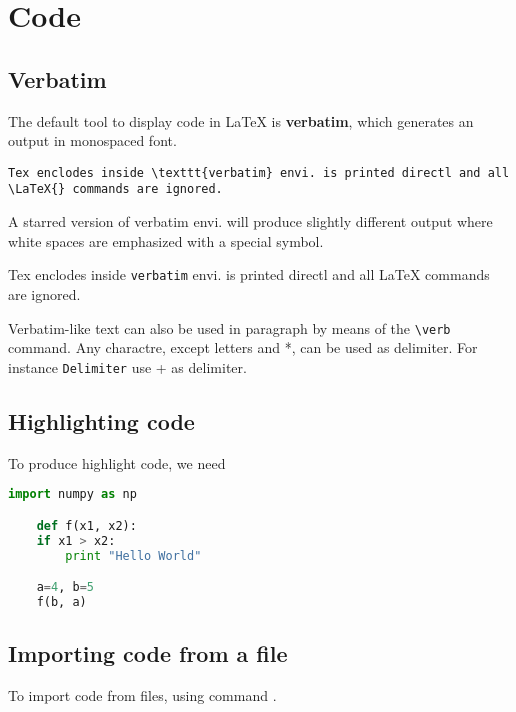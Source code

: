 \section{Code}

\subsection{Verbatim}
The default tool to display code in \LaTeX{} is \textbf{verbatim}, which
generates an output in monospaced font. 
\begin{verbatim}
Tex enclodes inside \texttt{verbatim} envi. is printed directl and all
\LaTeX{} commands are ignored.
\end{verbatim}

A starred version of verbatim envi. will produce slightly different output
where white spaces are emphasized with a special symbol.
\begin{verbatim*}
Tex enclodes inside \texttt{verbatim} envi. is printed directl and all
\LaTeX{} commands are ignored.
\end{verbatim*}

Verbatim-like text can also be used in paragraph by means of the
\verb|\verb| command. Any charactre, except letters and *, can be used as
delimiter. For instance \verb+Delimiter+ use + as delimiter.

\subsection{Highlighting code}
To produce highlight code, we need 
\begin{lstlisting}[language=Python]
    import numpy as np

    def f(x1, x2):
	if x1 > x2:
	    print "Hello World"

    a=4, b=5
    f(b, a)
\end{lstlisting}

\subsection{Importing code from a file}
To import code from files, using command \verb||.
\begin{lstlisting}[language=TeX]



\end{lstlisting}

